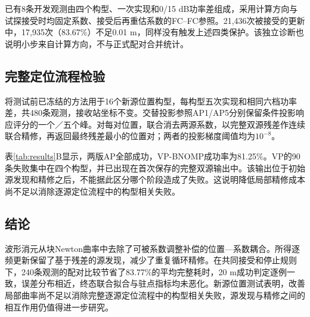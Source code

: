 \documentclass[a4paper,12pt,review]{cas-sc}
\begin{document}
已有8条开发观测由四个构型、一次实现和0/15 dB功率差组成，采用计算方向与试探接受时均固定系数、接受后再重估系数的FC--FC参照。21,436次被接受的更新中，17,935次（83.67\%）不足0.01 m，同样没有触发上述四类保护。该独立诊断也说明小步来自计算方向，不与正式配对合并统计。

\FloatBarrier
\subsection{完整定位流程检验}
将测试前已冻结的方法用于16个新源位置构型，每构型五次实现和相同六档功率差，共480条观测，接收站坐标不变。交替投影参照AP1/AP5分别保留条件投影响应评分的一个／五个峰。对每对位置，联合消去两源系数，以完整双源残差作连续联合精修，再返回最终残差最小的位置对；两者的投影梯度阈值均为$10^{-8}$。

表\ref{tab:results}B显示，两版AP全部成功，VP-BNOMP成功率为81.25\%。VP的90条失败集中在四个构型，并已出现在首次保存的完整双源输出中。该输出位于初始源发现和精修之后，不能据此区分哪个阶段造成了失败。这说明降低局部精修成本尚不足以消除逐源定位流程中的构型相关失败。

\begin{samepage}
\section{结论}
波形消元从块Newton曲率中去除了可被系数调整补偿的位置—系数耦合。所得逐频更新保留了基于残差的源发现，减少了重复循环精修。在共同接受和停止规则下，240条观测的配对比较节省了83.77\%的平均完整耗时，20 m成功判定逐例一致，误差分布相近，终态联合拟合与驻点指标均未恶化。新源位置测试表明，改善局部曲率尚不足以消除完整逐源定位流程中的构型相关失败，源发现与精修之间的相互作用仍值得进一步研究。
\end{samepage}



\end{document}
